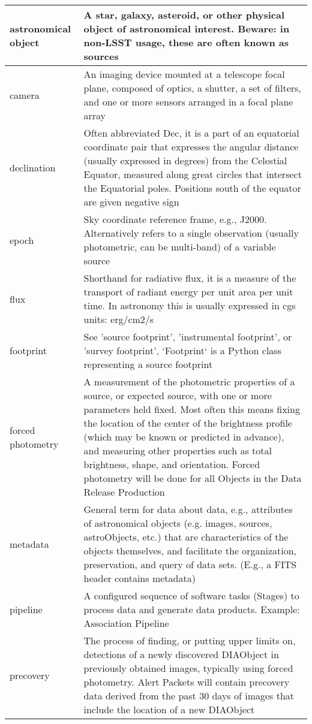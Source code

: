 \begin{longtable}{|p{}|p{}|}
astronomical object & A star, galaxy, asteroid, or other physical object of astronomical interest. Beware: in non-LSST usage, these are often known as sources \\\hline
camera & An imaging device mounted at a telescope focal plane, composed of optics, a shutter, a set of filters, and one or more sensors arranged in a focal plane array \\\hline
declination & Often abbreviated Dec, it is a part of an equatorial coordinate pair that expresses the angular distance (usually expressed in degrees) from the Celestial Equator, measured along great circles that intersect the Equatorial poles. Positions south of the equator are given negative sign \\\hline
epoch & Sky coordinate reference frame, e.g., J2000. Alternatively refers to a single observation (usually photometric, can be multi-band) of a variable source \\\hline
flux & Shorthand for radiative \gls{flux}, it is a measure of the transport of radiant energy per unit area per unit time. In astronomy this is usually expressed in cgs units: erg/cm2/s \\\hline
footprint & See 'source \gls{footprint}', 'instrumental \gls{footprint}', or 'survey \gls{footprint}', `Footprint` is a Python class representing a source \gls{footprint} \\\hline
forced photometry & A measurement of the photometric properties of a source, or expected source, with one or more parameters held fixed. Most often this means fixing the location of the center of the brightness profile (which may be known or predicted in advance), and measuring other properties such as total brightness, \gls{shape}, and orientation. Forced photometry will be done for all Objects in the \gls{Data Release} Production \\\hline
metadata & General term for data about data, e.g., attributes of astronomical objects (e.g. images, sources, astroObjects, etc.) that are characteristics of the objects themselves, and facilitate the organization, preservation, and query of data sets. (E.g., a \gls{FITS} header contains \gls{metadata}) \\\hline
pipeline & A configured sequence of software tasks (Stages) to process data and generate data products. Example: \gls{Association Pipeline} \\\hline
precovery & The process of finding, or putting upper limits on, detections of a newly discovered \gls{DIAObject} in previously obtained images, typically using \gls{forced photometry}. \gls{Alert} Packets will contain \gls{precovery} data derived from the past 30 days of images that include the location of a new \gls{DIAObject} \\\hline

\end{longtable}
